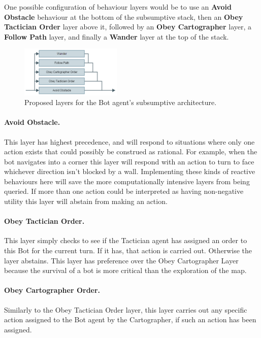 \documentclass[a4paper,10pt]{article}
\begin{document}
One possible configuration of behaviour layers would be to use an \textbf{Avoid Obstacle} behaviour at the bottom of the subsumptive stack, then an \textbf{Obey Tactician Order} layer above it, followed by an \textbf{Obey Cartographer} layer, a \textbf{Follow Path} layer, and finally a \textbf{Wander} layer at the top of the stack.

\begin{figure}
  \vspace{-5mm}
  \begin{center}
    \includegraphics[width=0.43\textwidth]{subsumptive}
    \caption{Proposed layers for the Bot agent's subsumptive architecture.}
  \end{center}
  \vspace{-5mm}
\end{figure}

\paragraph{Avoid Obstacle.} This layer has highest precedence, and will respond to situations where only one action exists that could possibly be construed as rational. For example, when the bot navigates into a corner this layer will respond with an action to turn to face whichever direction isn't blocked by a wall. Implementing these kinds of reactive behaviours here will save the more computationally intensive layers from being queried. If more than one action could be interpreted as having non-negative utility this layer will abstain from making an action.

\paragraph{Obey Tactician Order.} This layer simply checks to see if the Tactician agent has assigned an order to this Bot for the current turn. If it has, that action is carried out. Otherwise the layer abstains. This layer has preference over the Obey Cartographer Layer because the survival of a bot is more critical than the exploration of the map.

\paragraph{Obey Cartographer Order.} Similarly to the Obey Tactician Order layer, this layer carries out any specific action assigned to the Bot agent by the Cartographer, if such an action has been assigned.
\end{document}
